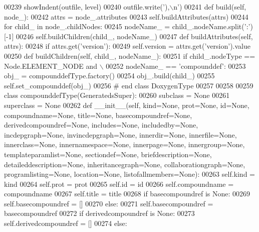 \begin{DoxyCode}
{{{{{{{{{{{{{{{{{{{{{{{{00239             showIndent(outfile, level)
00240             outfile.write(\textcolor{stringliteral}{'),\(\backslash\)n'})
00241     \textcolor{keyword}{def }build(self, node\_):
00242         attrs = node\_.attributes
00243         self.buildAttributes(attrs)
00244         \textcolor{keywordflow}{for} child\_ \textcolor{keywordflow}{in} node\_.childNodes:
00245             nodeName\_ = child\_.nodeName.split(\textcolor{stringliteral}{':'})[-1]
00246             self.buildChildren(child\_, nodeName\_)
00247     \textcolor{keyword}{def }buildAttributes(self, attrs):
00248         \textcolor{keywordflow}{if} attrs.get(\textcolor{stringliteral}{'version'}):
00249             self.version = attrs.get(\textcolor{stringliteral}{'version'}).value
00250     \textcolor{keyword}{def }buildChildren(self, child\_, nodeName\_):
00251         \textcolor{keywordflow}{if} child\_.nodeType == Node.ELEMENT\_NODE \textcolor{keywordflow}{and} \(\backslash\)
00252             nodeName\_ == \textcolor{stringliteral}{'compounddef'}:
00253             obj\_ = compounddefType.factory()
00254             obj\_.build(child\_)
00255             self.set_compounddef(obj\_)
00256 \textcolor{comment}{# end class DoxygenType}
00257 
00258 
00259 \textcolor{keyword}{class }compounddefType(GeneratedsSuper):
00260     subclass = \textcolor{keywordtype}{None}
00261     superclass = \textcolor{keywordtype}{None}
00262     \textcolor{keyword}{def }__init__(self, kind=None, prot=None, id=None, compoundname=None, title=None, basecompoundref=None, 
      derivedcompoundref=None, includes=None, includedby=None, incdepgraph=None, invincdepgraph=None, 
      innerdir=None, innerfile=None, innerclass=None, innernamespace=None, innerpage=None, innergroup=None, 
      templateparamlist=None, sectiondef=None, briefdescription=None, detaileddescription=None, inheritancegraph=None, 
      collaborationgraph=None, programlisting=None, location=None, listofallmembers=None):
00263         self.kind = kind
00264         self.prot = prot
00265         self.id = id
00266         self.compoundname = compoundname
00267         self.title = title
00268         \textcolor{keywordflow}{if} basecompoundref \textcolor{keywordflow}{is} \textcolor{keywordtype}{None}:
00269             self.basecompoundref = []
00270         \textcolor{keywordflow}{else}:
00271             self.basecompoundref = basecompoundref
00272         \textcolor{keywordflow}{if} derivedcompoundref \textcolor{keywordflow}{is} \textcolor{keywordtype}{None}:
00273             self.derivedcompoundref = []
00274         \textcolor{keywordflow}{else}:
}}}}}}}}}}}}}}}}}}}}}}}}
\end{DoxyCode}
